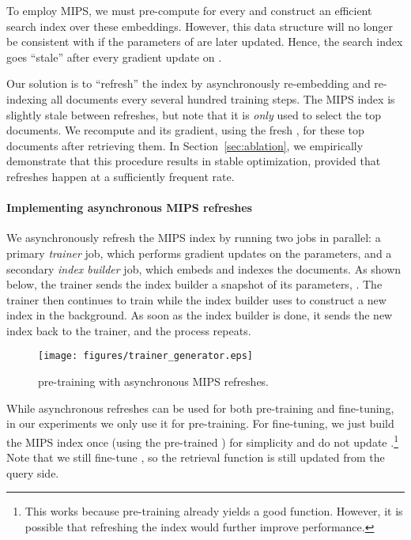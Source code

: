 \documentclass{article}
\begin{document}
To employ MIPS, we must pre-compute  for every   and construct an efficient search index over these embeddings. However, this data structure will no longer be consistent with  if the parameters  of  are later updated. Hence, the search index goes ``stale'' after every gradient update on .

Our solution is to ``refresh'' the index by asynchronously re-embedding and re-indexing all documents every several hundred training steps. The MIPS index is slightly stale between refreshes, but note that it is {\em only} used to select the top  documents. We recompute  and its gradient, using the fresh , for these top  documents after retrieving them.
In Section~\ref{sec:ablation}, we empirically demonstrate that this procedure results in stable optimization, provided that refreshes happen at a sufficiently frequent rate.

\paragraph{Implementing asynchronous MIPS refreshes}
We asynchronously refresh the MIPS index by running two jobs in parallel: a primary {\em trainer} job, which performs gradient updates on the parameters, and a secondary {\em index builder} job, which embeds and indexes the documents. As shown below, the trainer sends the index builder a snapshot of its parameters, . The trainer then continues to train while the index builder uses  to construct a new index in the background. As soon as the index builder is done, it sends the new index back to the trainer, and the process repeats.

{
\begin{figure}
\begin{center}
\texttt{[image: figures/trainer\_generator.eps]}
\caption{\thename pre-training with asynchronous MIPS refreshes.}
\end{center}
\end{figure}
}

While asynchronous refreshes can be used for both pre-training and fine-tuning, in our experiments we only use it for pre-training. For fine-tuning, we just build the MIPS index once (using the pre-trained ) for simplicity and do not update .\footnote{This works because pre-training already yields a good  function. However, it is possible that refreshing the index would further improve performance.} Note that we still fine-tune , so the retrieval function is still updated from the query side.
\end{document}
